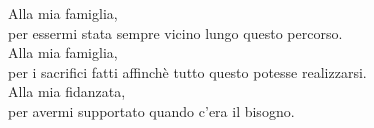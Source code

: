 \newpage\null\thispagestyle{empty}\newpage %
\thispagestyle{empty}
\newenvironment{dedication}
  {\clearpage           %
   \thispagestyle{empty}%
   \vspace*{\stretch{1}}%
   \itshape             %
   \raggedleft          %
  }
  {\par %
   \vspace{\stretch{3}} %
   \clearpage           %
  }

\begin{dedication}
Alla mia famiglia, \\per essermi stata sempre vicino lungo questo percorso.\\
Alla mia famiglia, \\per i sacrifici fatti affinchè tutto questo potesse realizzarsi.\\
Alla mia fidanzata, \\per avermi supportato quando c'era il bisogno.

\end{dedication}